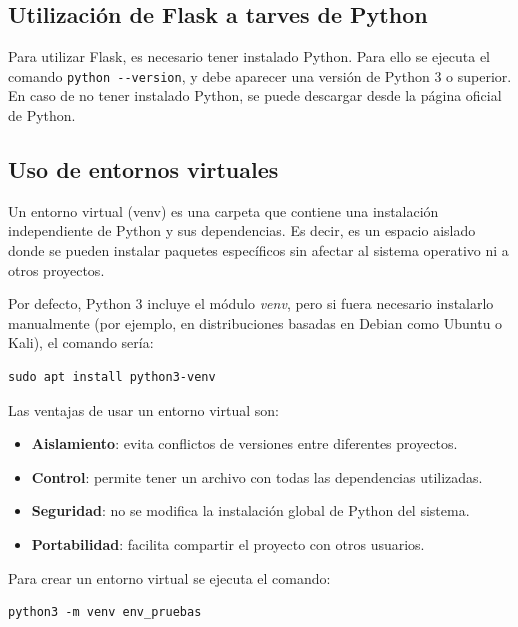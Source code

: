 \documentclass[10pt]{book}
\begin{document}
    \subsection{Utilización de Flask a tarves de Python}
        Para utilizar Flask, es necesario tener instalado Python. Para ello se ejecuta el comando \lstinline{python --version}, y debe aparecer una versión de Python 3 o superior.\\
        En caso de no tener instalado Python, se puede descargar desde la página oficial de Python.

    \subsection{Uso de entornos virtuales} 
    
    \cite{venv_python}Un entorno virtual (venv) es una carpeta que contiene una instalación independiente de Python y sus dependencias. Es decir, es un espacio aislado donde se pueden instalar paquetes específicos sin afectar al sistema operativo ni a otros proyectos. 
    
    Por defecto, Python 3 incluye el módulo \textit{venv}, pero si fuera necesario instalarlo manualmente (por ejemplo, en distribuciones basadas en Debian como Ubuntu o Kali), el comando sería:
    
    \begin{lstlisting}[style=simplebash]
    sudo apt install python3-venv
    \end{lstlisting}
    
    Las ventajas de usar un entorno virtual son:
    
    \begin{itemize}
        \item \textbf{Aislamiento}: evita conflictos de versiones entre diferentes proyectos.
        \item \textbf{Control}: permite tener un archivo con todas las dependencias utilizadas.
        \item \textbf{Seguridad}: no se modifica la instalación global de Python del sistema.
        \item \textbf{Portabilidad}: facilita compartir el proyecto con otros usuarios.
    \end{itemize}
    
    Para crear un entorno virtual se ejecuta el comando:
    
    \begin{lstlisting}[style=simplebash]
    python3 -m venv env_pruebas
    \end{lstlisting}
    
\end{document}
